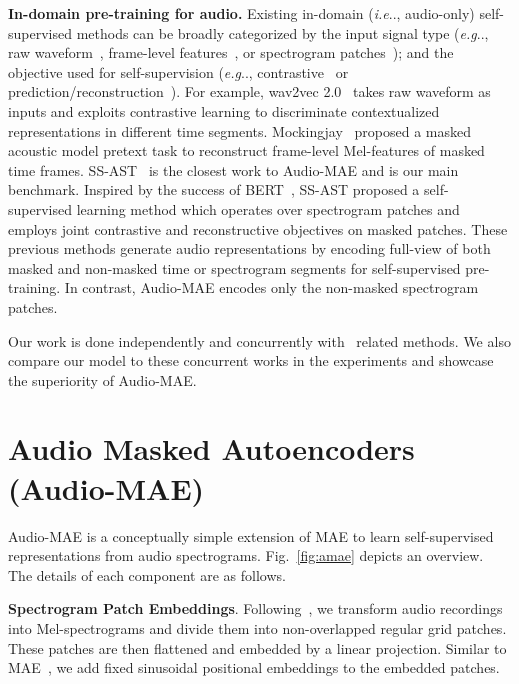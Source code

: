 \documentclass{article}
\makeatletter
\DeclareRobustCommand\onedot{\futurelet\@let@token\@onedot}
\def\@onedot{\ifx\@let@token.\else.\null\fi\xspace}
\def\eg{\emph{e.g}\onedot} \def\Eg{\emph{E.g}\onedot}
\def\ie{\emph{i.e}\onedot} \def\Ie{\emph{I.e}\onedot}
\renewcommand{\paragraph}[1]{\vspace{1.25mm}\noindent\textbf{#1}}
\makeatother
\begin{document}
\paragraph{In-domain pre-training for audio.}
Existing in-domain (\ie, audio-only) self-supervised methods can be broadly categorized by the input signal type (\eg, raw waveform~\cite{wav2vec,wav2vec2,d2v}, frame-level features~\cite{Hsu2021HuBERTSS,avhubert,srivastava2021conformer}, or spectrogram patches~\cite{ssast,baade2022}); and the objective used for self-supervision (\eg, contrastive~\cite{cpc,wav2vec2,object_sound,stica,Hsu2021HuBERTSS} or prediction/reconstruction~\cite{ssast,d2v,srivastava2021conformer,avhubert}).
For example, wav2vec 2.0~\cite{wav2vec2} takes raw waveform as inputs and exploits contrastive learning to discriminate contextualized representations in different time segments.
Mockingjay~\cite{mockingjay} proposed a masked acoustic model pretext task to reconstruct frame-level Mel-features of masked time frames.
SS-AST~\cite{ssast} is the closest work to Audio-MAE and is our main benchmark. 
Inspired by the success of BERT~\cite{bert}, SS-AST proposed a self-supervised learning method which operates over spectrogram patches and employs joint contrastive and reconstructive objectives on masked patches.
These previous methods generate audio representations by encoding full-view of both masked and non-masked time or spectrogram segments for self-supervised pre-training.
In contrast, Audio-MAE encodes only the non-masked spectrogram patches.


Our work is done independently and concurrently with~\cite{baade2022,chong2022masked,niizumi2022masked} related methods.
We also compare our model to these concurrent works in the experiments and showcase the superiority of Audio-MAE.







\section{Audio Masked Autoencoders (Audio-MAE)}




Audio-MAE is a conceptually simple extension of MAE to learn self-supervised representations from audio spectrograms. Fig.~\ref{fig:amae} depicts an overview. The details of each component are as follows.


\noindent \textbf{Spectrogram Patch Embeddings}. 
Following~\cite{gong2021ast,ssast}, we transform audio recordings into Mel-spectrograms and divide them into non-overlapped regular grid patches. These patches are then flattened and embedded by a linear projection.
Similar to MAE~\cite{mae}, 
we add fixed sinusoidal positional embeddings to the embedded patches.
\end{document}
